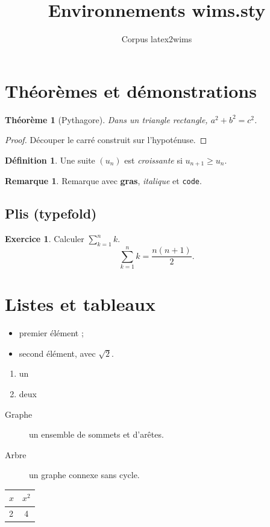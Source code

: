 \documentclass[11pt]{article}
\theoremstyle{plain}
\newtheorem{thm}{Théorème}[section]
\theoremstyle{definition}
\newtheorem{defn}{Définition}[section]
\newtheorem{exo}{Exercice}
\newtheorem{rem}{Remarque}
\newenvironment{sol}{}{}
\begin{document}
\title{Environnements wims.sty}
\author{Corpus latex2wims}
\section{Théorèmes et démonstrations}
\begin{thm}[Pythagore]
Dans un triangle rectangle, \(a^2+b^2=c^2\).
\end{thm}
\begin{proof}
Découper le carré construit sur l'hypoténuse.
\end{proof}
\begin{defn}
Une suite \((u_n)\) est \emph{croissante} si \(u_{n+1}\geq u_n\).
\end{defn}
\begin{rem}
Remarque avec \textbf{gras}, \textit{italique} et \texttt{code}.
\end{rem}
\subsection{Plis (typefold)}
\begin{exo}
Calculer \(\sum_{k=1}^n k\).
\begin{sol}
\[ \sum_{k=1}^n k = \frac{n(n+1)}{2}. \]
\end{sol}
\end{exo}
\section{Listes et tableaux}
\begin{itemize}
\item premier élément ;
\item second élément, avec \(\sqrt{2}\).
\end{itemize}
\begin{enumerate}
\item un
\item deux
\end{enumerate}
\begin{description}
\item[Graphe] un ensemble de sommets et d'arêtes.
\item[Arbre] un graphe connexe sans cycle.
\end{description}
\begin{tabular}{|l|c|}
\hline
\(x\) & \(x^2\) \\
\hline
2 & 4 \\
\hline
\end{tabular}
\end{document}
